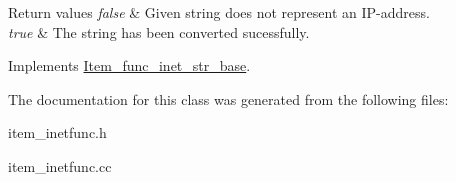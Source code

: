 \begin{DoxyRetVals}{Return values}
{\em false} & Given string does not represent an IP-\/address. \\
\hline
{\em true} & The string has been converted sucessfully. \\
\hline
\end{DoxyRetVals}


Implements \mbox{\hyperlink{classItem__func__inet__str__base}{Item\+\_\+func\+\_\+inet\+\_\+str\+\_\+base}}.



The documentation for this class was generated from the following files\+:\begin{DoxyCompactItemize}
\item 
item\+\_\+inetfunc.\+h\item 
item\+\_\+inetfunc.\+cc\end{DoxyCompactItemize}
